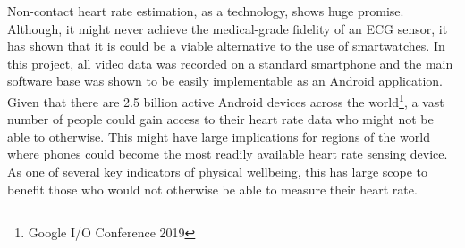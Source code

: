 

Non-contact heart rate estimation, as a technology, shows huge promise. Although, it might never achieve the medical-grade 
fidelity of an ECG sensor, it has shown that it is could be a viable alternative to the use of smartwatches. In this project, all video data was 
recorded on a standard smartphone and the main software base was shown to be easily implementable as an Android application.
Given that there are 2.5 billion active Android devices across the world\footnote{Google I/O Conference 2019}, a vast number of people could gain access
to their heart rate data who might not be able to otherwise. This might have large implications
for regions of the world where phones could become the most readily available heart rate sensing device. 
As one of several key indicators of physical wellbeing, this has large scope to benefit those who would not otherwise be able to measure their heart rate.


